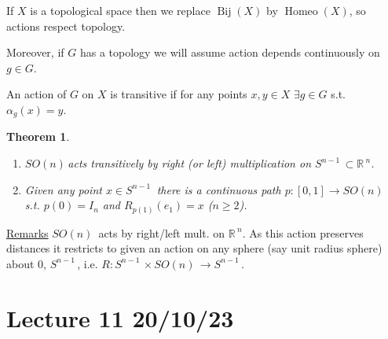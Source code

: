 \documentclass[12pt,a4paper]{article}
\newcommand{\rR}{\ensuremath{\mathbb{R}\,}}
\newcommand{\gson}{\ensuremath{SO(n)\,}}
\newcommand{\sph}[1]{\ensuremath{S^{#1}}\,}
\newcommand{\ul}[1]{\underline{#1}}
\newcommand{\bij}[1]{\ensuremath{\operatorname{Bij}(#1)}}
\newcommand{\homeo}[1]{\ensuremath{\operatorname{Homeo}(#1)}}
\newtheorem{thm}{Theorem}[subsubsection]
\begin{document}
If $X$ is a topological space then we replace $\bij{X}$ by $\homeo{X}$, so actions respect topology. 

Moreover, if $G$ has a topology we will assume action depends continuously on $g\in G$.

An action of $G$ on $X$ is transitive if for any points $x,y\in X$ $\exists g\in G$ s.t. $\alpha_g(x)=y$.

\begin{thm}
\hfill
\begin{enumerate}
\item \gson acts transitively by right (or left) multiplication on $\sph{n-1}\subset \rR^n$. \item Given any point $x\in \sph{n-1}$ there is a continuous path $p:[0,1]\to\gson$ s.t. $p(0)=I_n$ and $R_{p(1)}(e_1)=x$ ($n\geq 2$).
\end{enumerate}
\end{thm}

\ul{Remarks} $\gson$ acts by right/left mult. on $\rR^n$. As this action preserves distances it restricts to given an action on any sphere (say unit radius sphere) about $0$, $\sph{n-1}$, i.e. $R:\sph{n-1}\times \gson \to \sph{n-1}$.

\section{Lecture 11 20/10/23}
\end{document}
